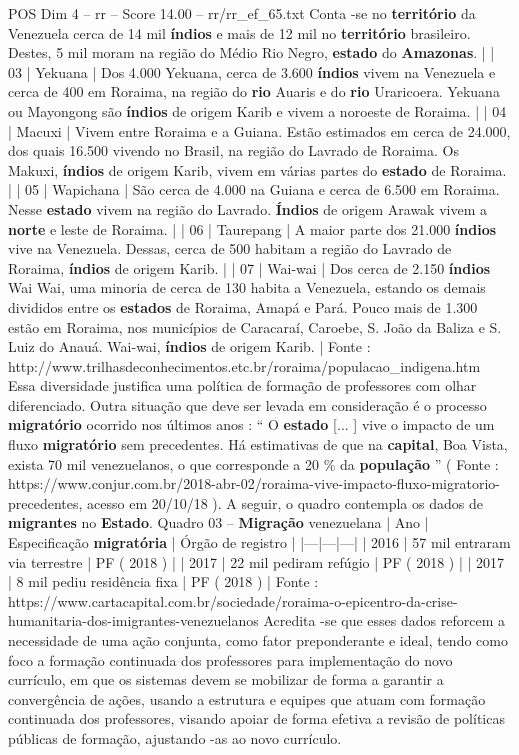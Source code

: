 \begin{textsample}{POS Dim 4 – rr – Score 14.00 – rr/rr\_ef\_65.txt}
Conta -se no \textbf{território} da Venezuela cerca de 14 mil \textbf{índios} e mais de 12 mil no \textbf{território} brasileiro.
Destes, 5 mil moram na região do Médio Rio Negro, \textbf{estado} do \textbf{Amazonas}. | | 03 | Yekuana | Dos 4.000 Yekuana, cerca de 3.600 \textbf{índios} vivem na Venezuela e cerca de 400 em Roraima, na região do \textbf{rio} Auaris e do \textbf{rio} Uraricoera.
Yekuana ou Mayongong são \textbf{índios} de origem Karib e vivem a noroeste de Roraima. | | 04 | Macuxi | Vivem entre Roraima e a Guiana.
Estão estimados em cerca de 24.000, dos quais 16.500 vivendo no Brasil, na região do Lavrado de Roraima.
Os Makuxi, \textbf{índios} de origem Karib, vivem em várias partes do \textbf{estado} de Roraima. | | 05 | Wapichana | São cerca de 4.000 na Guiana e cerca de 6.500 em Roraima.
Nesse \textbf{estado} vivem na região do Lavrado. \textbf{Índios} de origem Arawak vivem a \textbf{norte} e leste de Roraima. | | 06 | Taurepang | A maior parte dos 21.000 \textbf{índios} vive na Venezuela.
Dessas, cerca de 500 habitam a região do Lavrado de Roraima, \textbf{índios} de origem Karib. | | 07 | Wai-wai | Dos cerca de 2.150 \textbf{índios} Wai Wai, uma minoria de cerca de 130 habita a Venezuela, estando os demais divididos entre os \textbf{estados} de Roraima, Amapá e Pará.
Pouco mais de 1.300 estão em Roraima, nos municípios de Caracaraí, Caroebe, S.
João da Baliza e S.
Luiz do Anauá.
Wai-wai, \textbf{índios} de origem Karib. | Fonte : http://www.trilhasdeconhecimentos.etc.br/roraima/populacao\_indigena.htm Essa diversidade justifica uma política de formação de professores com olhar diferenciado.
Outra situação que deve ser levada em consideração é o processo \textbf{migratório} ocorrido nos últimos anos : “ O \textbf{estado} [... ] vive o impacto de um fluxo \textbf{migratório} sem precedentes.
Há estimativas de que na \textbf{capital}, Boa Vista, exista 70 mil venezuelanos, o que corresponde a 20 \% da \textbf{população} ” ( Fonte : https://www.conjur.com.br/2018-abr-02/roraima-vive-impacto-fluxo-migratorio-precedentes, acesso em 20/10/18 ).
A seguir, o quadro contempla os dados de \textbf{migrantes} no \textbf{Estado}.
Quadro 03 – \textbf{Migração} venezuelana | Ano | Especificação \textbf{migratória} | Órgão de registro | |---|---|---| | 2016 | 57 mil entraram via terrestre | PF ( 2018 ) | | 2017 | 22 mil pediram refúgio | PF ( 2018 ) | | 2017 | 8 mil pediu residência fixa | PF ( 2018 ) | Fonte : https://www.cartacapital.com.br/sociedade/roraima-o-epicentro-da-crise-humanitaria-dos-imigrantes-venezuelanos Acredita -se que esses dados reforcem a necessidade de uma ação conjunta, como fator preponderante e ideal, tendo como foco a formação continuada dos professores para implementação do novo currículo, em que os sistemas devem se mobilizar de forma a garantir a convergência de ações, usando a estrutura e equipes que atuam com formação continuada dos professores, visando apoiar de forma efetiva a revisão de políticas públicas de formação, ajustando -as ao novo currículo.

\end{textsample}
